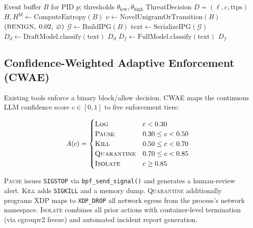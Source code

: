 \documentclass[journal]{IEEEtran}
\newcommand{\cwae}{CWAE}
\newcommand{\ebpf}{eBPF}
\begin{document}
\begin{algorithm}[!t]
\caption{Dual-Tier Inference (BENIGN-only fast-path)}\label{alg:inference}
\footnotesize
\begin{algorithmic}[1]
\Require Event buffer $B$ for PID $p$; thresholds $\theta_{\text{low}}, \theta_{\text{high}}$
\Ensure ThreatDecision $D = (\ell, c, \text{ttps})$
\State $H, H^{\mathrm{M}} \gets \text{ComputeEntropy}(B)$ \Comment{marginal + Markov, \ebpf{} map}
\State $\nu \gets \text{NovelUnigramOrTransition}(B)$
  \Return $({\small\textsc{BENIGN}},\; 0.02,\; \varnothing)$
\EndIf
\State $\mathcal{G} \gets \text{BuildIPG}(B)$ 
\State $\text{text} \gets \text{SerializeIPG}(\mathcal{G})$
  \State $D_d \gets \text{DraftModel.classify}(\text{text})$
    \Return $D_d$ 
  \EndIf
\EndIf
\State $D_f \gets \text{FullModel.classify}(\text{text})$
\Return $D_f$
\end{algorithmic}
\end{algorithm}

\subsection{Confidence-Weighted Adaptive Enforcement (CWAE)}\label{sec:enforce}

Existing tools enforce a binary block/allow decision.  \cwae{} maps the
continuous LLM confidence score $c \in [0,1]$ to five enforcement tiers:

\begin{equation}
A(c) = \begin{cases}
  \textsc{Log} & c < 0.30 \\
  \textsc{Pause} & 0.30 \leq c < 0.50 \\
  \textsc{Kill} & 0.50 \leq c < 0.70 \\
  \textsc{Quarantine} & 0.70 \leq c < 0.85 \\
  \textsc{Isolate} & c \geq 0.85
\end{cases}
\label{eq:cwae}
\end{equation}

\textsc{Pause} issues \texttt{SIGSTOP} via \texttt{bpf\_send\_signal()} and
generates a human-review alert.  \textsc{Kill} adds \texttt{SIGKILL} and a
memory dump.  \textsc{Quarantine} additionally programs XDP maps to
\texttt{XDP\_DROP} all network egress from the process's network namespace.
\textsc{Isolate} combines all prior actions with container-level termination
(via cgroupv2 freeze) and automated incident report generation.
\end{document}
